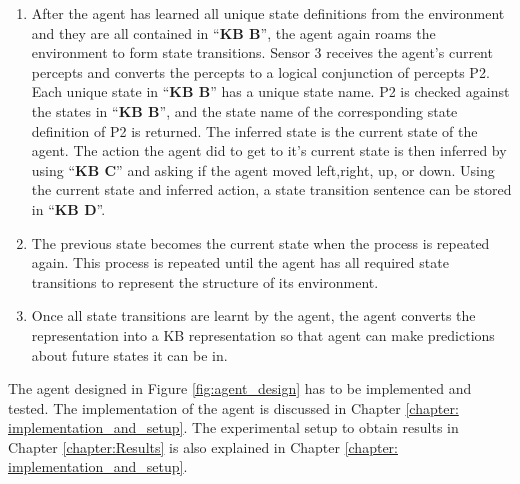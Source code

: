\begin{enumerate}
\item After the agent has learned all unique state definitions from the environment and they are all contained in ``\textbf{KB B}'', the agent again roams the environment to form state transitions. Sensor 3 receives the agent's current percepts and converts the percepts to a logical conjunction of percepts P2. Each unique state in ``\textbf{KB B}'' has a unique state name. P2 is checked against the states in ``\textbf{KB B}'', and the state name of the corresponding state definition of P2 is returned. The inferred state is the current state of the agent. The action the agent did to get to it's current state is then inferred by using ``\textbf{KB C}'' and asking if the agent moved left,right, up, or down. Using the current state and inferred action, a state transition sentence can be stored in ``\textbf{KB D}''.
\item The previous state becomes the current state when the process is repeated again. This process is repeated until the agent has all required state transitions to represent the structure of its environment. 
\item Once all state transitions are learnt by the agent, the agent converts the representation into a KB representation so that agent can make predictions about future states it can be in.

\end{enumerate}

The agent designed in Figure \ref{fig:agent_design} has to be implemented and tested. The implementation of the agent is discussed in Chapter \ref{chapter: implementation_and_setup}. The experimental setup to obtain results in Chapter \ref{chapter:Results} is also explained in Chapter \ref{chapter: implementation_and_setup}.



